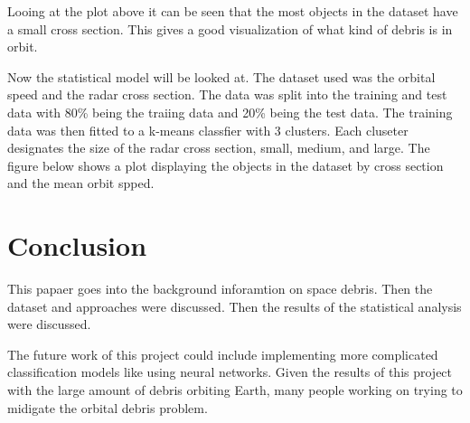 \documentclass[12pt,a4paper]{article}
\begin{document}
Looing at the plot above it can be seen that the most objects in the dataset have a small cross section. This gives a good visualization of what kind of debris is in orbit. 

Now the statistical model will be looked at. The dataset used was the orbital speed and the radar cross section. The data was split into the training and test data with 80\% being the traiing data and 20\% being the test data. The training data was then fitted to a k-means classfier with 3 clusters. Each cluseter designates the size of the radar cross section, small, medium, and large. The figure below shows a plot displaying the objects in the dataset by cross section and the mean orbit spped.  


\section{Conclusion}
This papaer goes into the background inforamtion on space debris. Then the dataset and approaches were discussed. Then the results of the statistical analysis were discussed.

The future work of this project could include implementing more complicated classification models like using neural networks.
Given the results of this project with the large amount of debris orbiting Earth, many people working on trying to midigate the orbital debris problem. 

 
\end{document}

